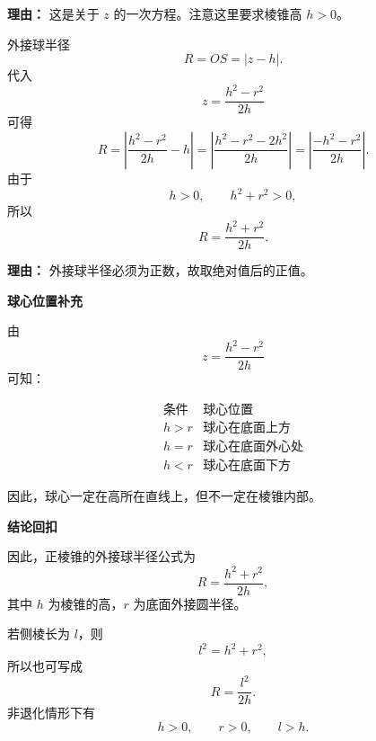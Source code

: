 \begin{proofbox}
\begin{description}[style=nextline, leftmargin=2.8em, labelsep=0.5em, itemsep=0.55em]
		      \par\textbf{理由：} 这是关于 $z$ 的一次方程。注意这里要求棱锥高 $h>0$。

		\item[\textbf{步骤六（求外接球半径 $R$）：}]
		      外接球半径
		      \[
			      R=OS=|z-h|.
		      \]
		      代入
		      \[
			      z=\frac{h^2-r^2}{2h}
		      \]
		      可得
		      \[
			      R
			      =
			      \left|\frac{h^2-r^2}{2h}-h\right|
			      =
			      \left|\frac{h^2-r^2-2h^2}{2h}\right|
			      =
			      \left|\frac{-h^2-r^2}{2h}\right|.
		      \]
		      由于
		      \[
			      h>0,\qquad h^2+r^2>0,
		      \]
		      所以
		      \[
			      R=\frac{h^2+r^2}{2h}.
		      \]

		      \par\textbf{理由：} 外接球半径必须为正数，故取绝对值后的正值。

	\end{description}

	\medskip
	\textbf{\textcolor{CProof}{球心位置补充}}

	由
	\[
		z=\frac{h^2-r^2}{2h}
	\]
	可知：

	\[
		\begin{array}{c|c}
			\text{条件} & \text{球心位置}     \\ \hline
			h>r       & \text{球心在底面上方}  \\[3pt]
			h=r       & \text{球心在底面外心处} \\[3pt]
			h<r       & \text{球心在底面下方}
		\end{array}
	\]

	因此，球心一定在高所在直线上，但不一定在棱锥内部。

	\medskip
	\textbf{\textcolor{CProof}{结论回扣}}

	因此，正棱锥的外接球半径公式为
	\[
		R=\frac{h^2+r^2}{2h},
	\]
	其中 $h$ 为棱锥的高，$r$ 为底面外接圆半径。

	若侧棱长为 $l$，则
	\[
		l^2=h^2+r^2,
	\]
	所以也可写成
	\[
		R=\frac{l^2}{2h}.
	\]
	非退化情形下有
	\[
		h>0,\qquad r>0,\qquad l>h.
	\]

\end{proofbox}